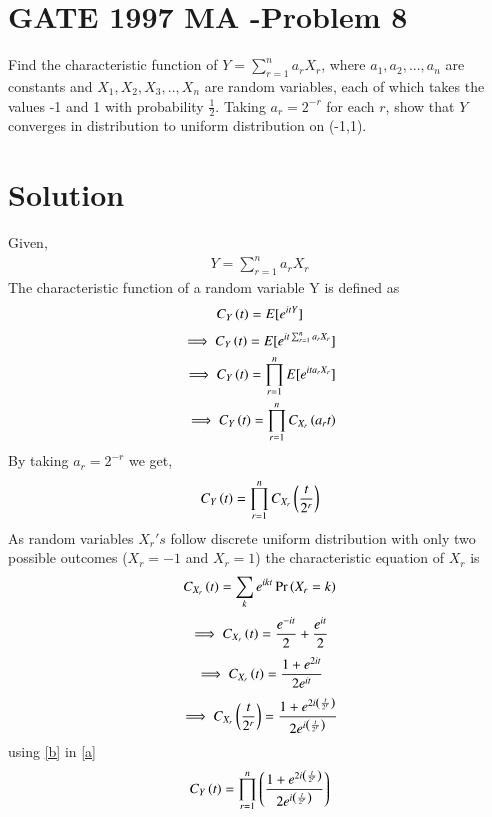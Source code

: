 \documentclass[journal,12pt,twocolumn]{IEEEtran}
\begin{document}
\section*{GATE 1997 MA -Problem 8}
    Find the characteristic function of $Y=\sum_{r=1}^{n}a_rX_r$, where $a_1,a_2,...,a_n$ are constants and $X_1,X_2,X_3,..,X_n$ are random variables, each of which takes the values -1 and 1 with probability $\frac{1}{2}$. Taking $a_r=2^{-r}$ for each $r$, show that $Y$ converges in distribution to uniform distribution on (-1,1).
   
\section*{Solution}
Given,
\begin{align}
    Y=\sum_{r=1}^{n}a_rX_r
\end{align}
The characteristic function of a random variable Y is defined as
\begin{align}
    C_{Y}\left(t\right)=E[e^{itY}]
\end{align}
\begin{align}
    \implies C_{Y}\left(t\right)=E[e^{it\sum_{r=1}^{n}a_rX_r}]\\
    \implies C_{Y}\left(t\right)=\prod_{r=1}^{n}E[e^{ita_rX_r}]\\
    \implies C_{Y}\left(t\right)=\prod_{r=1}^{n}C_{X_r}\left(a_rt\right)
\end{align}
By taking $a_r=2^{-r}$ we get,
\begin{align}
    C_{Y}\left(t\right)=\prod_{r=1}^{n}C_{X_r}\left(\frac{t}{2^r}\right)
    \label{a}
\end{align}
As random variables $X_r's$ follow discrete uniform distribution with only two possible outcomes ($X_r=-1$ and $X_r=1$) the characteristic equation of $X_r$ is
\begin{align}
    C_{X_r}\left(t\right)=\sum_{k}e^{ikt}\Pr\left(X_r=k\right)
\end{align}
\begin{align}
    \implies C_{X_r}\left(t\right)=\frac{e^{-it}}{2}+\frac{e^{it}}{2}
\end{align}
\begin{align}
    \implies C_{X_r}\left(t\right)=\frac{1+e^{2it}}{2e^{it}}
\end{align}
\begin{align}
        \implies C_{X_r}\left(\frac{t}{2^r}\right)=\frac{1+e^{2i\left(\frac{t}{2^r}\right)}}{2e^{i\left(\frac{t}{2^r}\right)}}
        \label{b}
\end{align}
using \eqref{b} in \eqref{a}
\begin{align}
    C_{Y}\left(t\right)=\prod_{r=1}^{n}\left(\frac{1+e^{2i\left(\frac{t}{2^r}\right)}}{2e^{i\left(\frac{t}{2^r}\right)}}\right)
\end{align}
\end{document}
